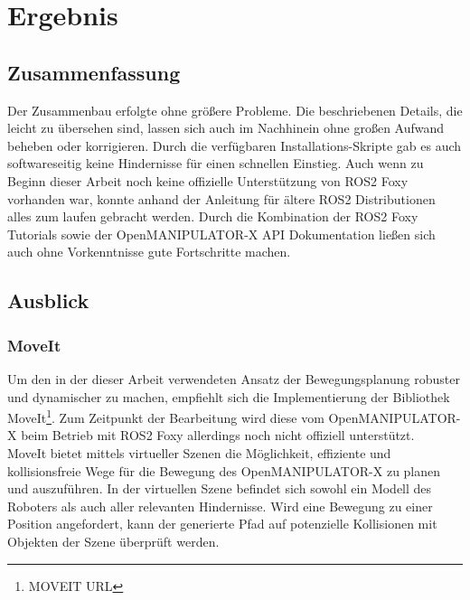 \section{Ergebnis}
\subsection{Zusammenfassung}
Der Zusammenbau erfolgte ohne größere Probleme.
Die beschriebenen Details, die leicht zu übersehen sind, lassen sich auch im Nachhinein ohne großen Aufwand beheben oder korrigieren.
Durch die verfügbaren Installations-Skripte gab es auch softwareseitig keine Hindernisse für einen schnellen Einstieg.
Auch wenn zu Beginn dieser Arbeit noch keine offizielle Unterstützung von \ac{ROS2} Foxy vorhanden war, konnte anhand der Anleitung für ältere \ac{ROS2} Distributionen alles zum laufen gebracht werden.
Durch die Kombination der \ac{ROS2} Foxy Tutorials sowie der OpenMANIPULATOR-X API Dokumentation ließen sich auch ohne Vorkenntnisse gute Fortschritte machen.
\subsection{Ausblick}
\subsubsection{MoveIt}
Um den in der dieser Arbeit verwendeten Ansatz der Bewegungsplanung robuster und dynamischer zu machen, empfiehlt sich die Implementierung der Bibliothek MoveIt\footnote{MOVEIT URL}.
Zum Zeitpunkt der Bearbeitung wird diese vom OpenMANIPULATOR-X beim Betrieb mit \ac{ROS2} Foxy allerdings noch nicht offiziell unterstützt.\\
MoveIt bietet mittels virtueller Szenen die Möglichkeit, effiziente und kollisionsfreie Wege für die Bewegung des OpenMANIPULATOR-X zu planen und auszuführen.
In der virtuellen Szene befindet sich sowohl ein Modell des Roboters als auch aller relevanten Hindernisse.
Wird eine Bewegung zu einer Position angefordert, kann der generierte Pfad auf potenzielle Kollisionen mit Objekten der Szene überprüft werden.
